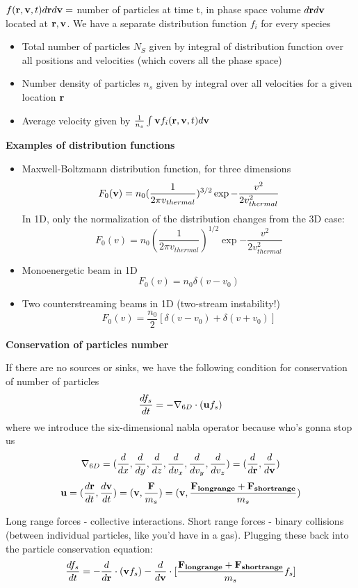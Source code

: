 \documentclass[PlasmaNotes.tex]{subfiles}
\begin{document}
$f(\mathbf{r}, \mathbf{v}, t) d\mathbf{r} d\mathbf{v} = $ number of particles at time t, in phase space volume $d\mathbf{r} d\mathbf{v}$ located at $\mathbf{r}, \mathbf{v}$. We have a separate distribution function $f_i$ for every species
\begin{itemize}
\item Total number of particles $N_S$ given by integral of distribution function over all positions and velocities (which covers all the phase space)
\item Number density of particles $n_s$ given by integral over all velocities for a given location $\mathbf{r}$ 
\item Average velocity given by $\frac{1}{n_s} \int \mathbf{v} f_i(\mathbf{r}, \mathbf{v}, t)  d\mathbf{v}$
\end{itemize}
\par \textbf{Examples of distribution functions}
\begin{itemize}
	\item Maxwell-Boltzmann distribution function, for three dimensions
	\[ F_0(\mathbf{v}) = n_0 (\frac{1}{2 \pi v_{thermal}})^{3/2} \exp{-\frac{v^2}{2 v_{thermal}^2}} \] %
	In 1D, only the normalization of the distribution changes from the 3D case:
	\[ F_0(v) = n_0 (\frac{1}{2 \pi v_{thermal}})^{1/2} \exp{-\frac{v^2}{2 v_{thermal}^2}} \]
	\item Monoenergetic beam in 1D
	\[ F_0(v) = n_0 \delta (v-v_0) \]
	\item Two counterstreaming beams in 1D (two-stream instability!)
	\[ F_0(v) = \frac{n_0}{2} [\delta (v-v_0) + \delta(v+v_0)] \]
\end{itemize}

\textbf{Conservation of particles number}

If there are no sources or sinks, we have the following condition for conservation of number of particles
\[ \frac{d f_s}{d t} = -\nabla_{6D} \cdot (\mathbf{u} f_s) \]
where we introduce the six-dimensional nabla operator because who's gonna stop us
\[ \nabla_{6D} = ( \frac{d }{d x},\frac{d }{d y},\frac{d }{d z},\frac{d }{d v_x},\frac{d }{d v_y},\frac{d }{d v_z}) = (\frac{d }{d \mathbf{r}}, \frac{d }{d \mathbf{v}}) \]
\[ \mathbf{u} = (\frac{d \mathbf{r}}{d t}, \frac{d \mathbf{v}}{d t}) = (\mathbf{v}, \frac{\mathbf{F}}{m_s}) = (\mathbf{v}, \frac{\mathbf{F_{long range}} + \mathbf{F_{short range}}}{m_s}) \] %

Long range forces - collective interactions. Short range forces - binary collisions (between individual particles, like you'd have in a gas).
Plugging these back into the particle conservation equation:
\[ \frac{d f_s}{d t} = -\frac{d }{d \mathbf{r}} \cdot (\mathbf{v} f_s) - \frac{d }{d \mathbf{v}} \cdot [\frac{\mathbf{F_{long range}} + \mathbf{F_{short range}}}{m_s} f_s] \]
\end{document}
